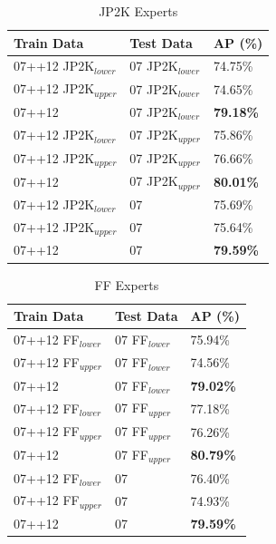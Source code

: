 \begin{table}[h]
\centering
\caption{JP2K Experts}
\label{tab:jp2k_experts}
\begin{tabular}{|l|l|l|}
\hline
\textbf{Train Data}           & \textbf{Test Data}        & \textbf{AP (\%)} \\ \hline
07++12 JP2K$_{lower}$ & 07 JP2K$_{lower}$ & 74.75\% \\ \hline
07++12 JP2K$_{upper}$ & 07 JP2K$_{lower}$ & 74.65\% \\ \hline
07++12               & 07 JP2K$_{lower}$ & \textbf{79.18\%} \\ \hline
07++12 JP2K$_{lower}$ & 07 JP2K$_{upper}$ & 75.86\% \\ \hline
07++12 JP2K$_{upper}$ & 07 JP2K$_{upper}$ & 76.66\% \\ \hline
07++12               & 07 JP2K$_{upper}$ & \textbf{80.01\%} \\ \hline
07++12 JP2K$_{lower}$ & 07               & 75.69\% \\ \hline
07++12 JP2K$_{upper}$ & 07               & 75.64\% \\ \hline
07++12               & 07               & \textbf{79.59\%} \\ \hline
\end{tabular}
\end{table}


\begin{table}[h]
\centering
\caption{FF Experts}
\label{tab:ff_experts}
\begin{tabular}{|l|l|l|}
\hline
\textbf{Train Data}           & \textbf{Test Data}        & \textbf{AP (\%)} \\ \hline
07++12 FF$_{lower}$ & 07 FF$_{lower}$ & 75.94\% \\ \hline
07++12 FF$_{upper}$ & 07 FF$_{lower}$ & 74.56\% \\ \hline
07++12               & 07 FF$_{lower}$ & \textbf{79.02\%} \\ \hline
07++12 FF$_{lower}$ & 07 FF$_{upper}$ & 77.18\% \\ \hline
07++12 FF$_{upper}$ & 07 FF$_{upper}$ & 76.26\% \\ \hline
07++12               & 07 FF$_{upper}$ & \textbf{80.79\%} \\ \hline
07++12 FF$_{lower}$ & 07               & 76.40\% \\ \hline
07++12 FF$_{upper}$ & 07               & 74.93\% \\ \hline
07++12               & 07               & \textbf{79.59\%} \\ \hline
\end{tabular}
\end{table}

